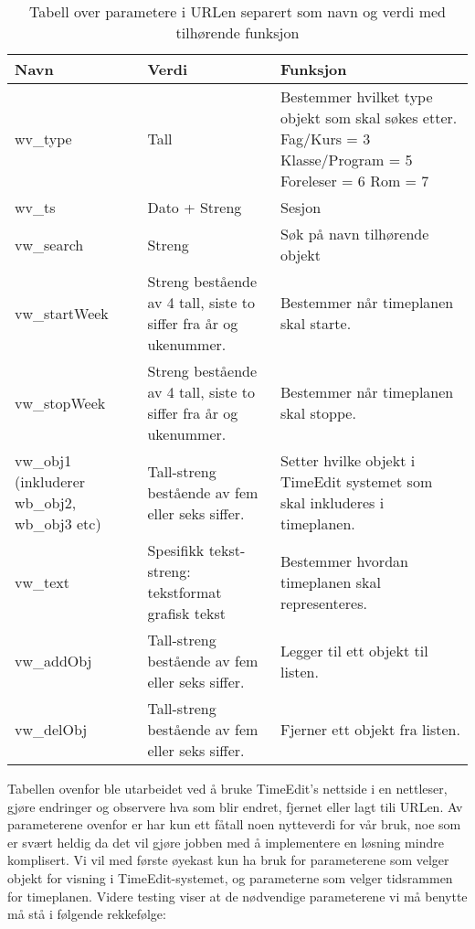 \documentclass[../main.tex]{subfiles}
\begin{document}
\begin{table}[H]
\begin{center}
\caption{Tabell over parametere i URLen separert som navn og verdi med tilhørende funksjon}
  \begin{tabular}{ | p{3cm} | p{6cm} | p{6cm} |}
    \hline
    Navn & Verdi & Funksjon \\ \hline
    wv\_type & Tall & Bestemmer hvilket type objekt som skal søkes etter. \newline Fag/Kurs = 3 \newline Klasse/Program = 5 \newline Foreleser = 6 \newline Rom = 7 \\ \hline
    wv\_ts & Dato + Streng & Sesjon \\ \hline
    vw\_search & Streng & Søk på navn tilhørende objekt \\ \hline
    vw\_startWeek & Streng bestående av 4 tall, siste to siffer fra år og ukenummer. & Bestemmer når timeplanen skal starte. \\ \hline
    vw\_stopWeek & Streng bestående av 4 tall, siste to siffer fra år og ukenummer. & Bestemmer når timeplanen skal stoppe. \\ \hline
    vw\_obj1 \newline (inkluderer wb\_obj2, \newline wb\_obj3 etc) & Tall-streng bestående av fem eller seks siffer. & Setter hvilke objekt i TimeEdit systemet som skal inkluderes i timeplanen. \\ \hline
    vw\_text & Spesifikk tekst-streng: \newline tekstformat \newline grafisk \newline tekst & Bestemmer hvordan timeplanen skal representeres. \\ \hline
    vw\_addObj & Tall-streng bestående av fem eller seks siffer. & Legger til ett objekt til listen. \\ \hline
    vw\_delObj & Tall-streng bestående av fem eller seks siffer. & Fjerner ett objekt fra listen. \\
    \hline
  \end{tabular}
\end{center}
\end{table}

Tabellen ovenfor ble utarbeidet ved å bruke TimeEdit's nettside i en nettleser, gjøre endringer og observere hva som blir endret, fjernet eller lagt tili URLen. Av parameterene ovenfor er har kun ett fåtall noen nytteverdi for vår bruk, noe som er svært heldig da det vil gjøre jobben med å implementere en løsning mindre komplisert. Vi vil med første øyekast kun ha bruk for parameterene som velger objekt for visning i TimeEdit-systemet, og parameterne som velger tidsrammen for timeplanen. Videre testing viser at de nødvendige parameterene vi må benytte må stå i følgende rekkefølge:
\end{document}
